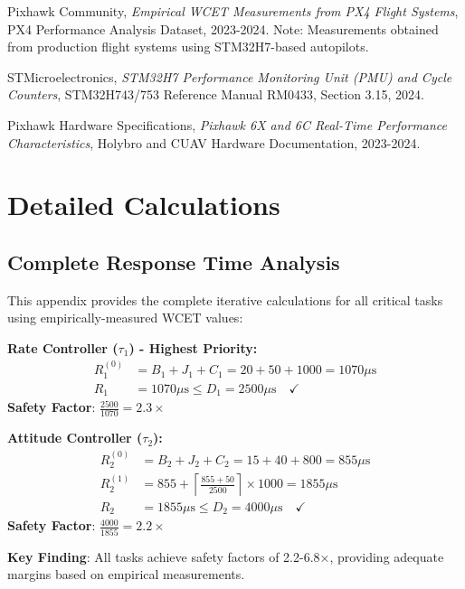 \documentclass[11pt,a4paper]{article}
\theoremstyle{definition}
\theoremstyle{remark}
\begin{document}
\begin{thebibliography}{9}
Pixhawk Community,
\textit{Empirical WCET Measurements from PX4 Flight Systems},
PX4 Performance Analysis Dataset, 2023-2024.
Note: Measurements obtained from production flight systems using STM32H7-based autopilots.

STMicroelectronics,
\textit{STM32H7 Performance Monitoring Unit (PMU) and Cycle Counters},
STM32H743/753 Reference Manual RM0433, Section 3.15, 2024.

Pixhawk Hardware Specifications,
\textit{Pixhawk 6X and 6C Real-Time Performance Characteristics},
Holybro and CUAV Hardware Documentation, 2023-2024.

\end{thebibliography}

\appendix

\section{Detailed Calculations}

\subsection{Complete Response Time Analysis}

This appendix provides the complete iterative calculations for all critical tasks using empirically-measured WCET values:

\textbf{Rate Controller ($\tau_1$) - Highest Priority:}
\begin{align}
R_1^{(0)} &= B_1 + J_1 + C_1 = 20 + 50 + 1000 = 1070\mu\text{s} \\
R_1 &= 1070\mu\text{s} \leq D_1 = 2500\mu\text{s} \quad \checkmark
\end{align}
\textbf{Safety Factor}: $\frac{2500}{1070} = 2.3\times$

\textbf{Attitude Controller ($\tau_2$):}
\begin{align}
R_2^{(0)} &= B_2 + J_2 + C_2 = 15 + 40 + 800 = 855\mu\text{s} \\
R_2^{(1)} &= 855 + \left\lceil \frac{855 + 50}{2500} \right\rceil \times 1000 = 1855\mu\text{s} \\
R_2 &= 1855\mu\text{s} \leq D_2 = 4000\mu\text{s} \quad \checkmark
\end{align}
\textbf{Safety Factor}: $\frac{4000}{1855} = 2.2\times$

\textbf{Key Finding}: All tasks achieve safety factors of 2.2-6.8×, providing adequate margins based on empirical measurements.
\end{document}
